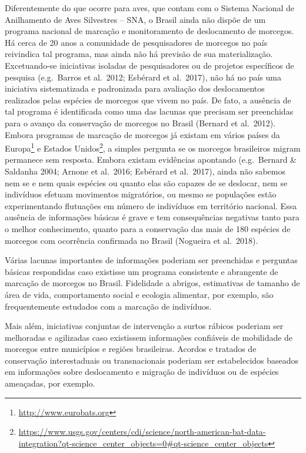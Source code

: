 \documentclass[
  oneside]{scrbook}
\DeclareRobustCommand{\href}[2]{#2\footnote{\url{#1}}}
\begin{document}
Diferentemente do que ocorre para aves, que contam com o Sistema Nacional de Anilhamento de Aves Silvestres -- SNA, o Brasil ainda não dispõe de um programa nacional de marcação e monitoramento de deslocamento de morcegos. Há cerca de 20 anos a comunidade de pesquisadores de morcegos no país reivindica tal programa, mas ainda não há previsão de sua materialização. Excetuando-se iniciativas isoladas de pesquisadores ou de projetos específicos de pesquisa (e.g.~Barros et al.~2012; Esbérard et al.~2017), não há no país uma iniciativa sistematizada e padronizada para avaliação dos deslocamentos realizados pelas espécies de morcegos que vivem no país. De fato, a ausência de tal programa é identificada como uma das lacunas que precisam ser preenchidas para o avanço da conservação de morcegos no Brasil (Bernard et al.~2012). Embora programas de marcação de morcegos já existam em vários países da \href{http://www.eurobats.org}{Europa} e \href{https://www.usgs.gov/centers/cdi/science/north-american-bat-data-integration?qt-science_center_objects=0\#qt-science_center_objects}{Estados Unidos}, a simples pergunta se os morcegos brasileiros migram permanece sem resposta. Embora existam evidências apontando (e.g.~Bernard \& Saldanha 2004; Arnone et al.~2016; Esbérard et al.~2017), ainda não sabemos nem se e nem quais espécies ou quanto elas são capazes de se deslocar, nem se indivíduos efetuam movimentos migratórios, ou mesmo se populações estão experimentando flutuações em número de indivíduos em território nacional. Essa ausência de informações básicas é grave e tem consequências negativas tanto para o melhor conhecimento, quanto para a conservação das mais de 180 espécies de morcegos com ocorrência confirmada no Brasil (Nogueira et al.~2018).

Várias lacunas importantes de informações poderiam ser preenchidas e perguntas básicas respondidas caso existisse um programa consistente e abrangente de marcação de morcegos no Brasil. Fidelidade a abrigos, estimativas de tamanho de área de vida, comportamento social e ecologia alimentar, por exemplo, são frequentemente estudados com a marcação de indivíduos.

Mais além, iniciativas conjuntas de intervenção a surtos rábicos poderiam ser melhoradas e agilizadas caso existissem informações confiáveis de mobilidade de morcegos entre municípios e regiões brasileiras. Acordos e tratados de conservação interestaduais ou transnacionais poderiam ser estabelecidos baseados em informações sobre deslocamento e migração de indivíduos ou de espécies ameaçadas, por exemplo.
\end{document}
